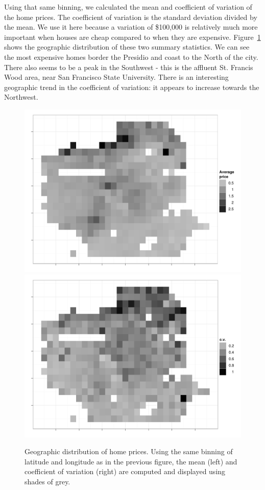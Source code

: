 \documentclass[oneside]{article}
\begin{document}
Using that same binning, we calculated the mean and coefficient of variation of the home prices.  The coefficient of variation is the standard deviation divided by the mean.  We use it here because a variation of \$100,000 is relatively much more important when houses are cheap compared to when they are expensive.  Figure~\ref{fig:sf-price} shows the geographic distribution of these two summary statistics.   We can see the most expensive homes border the Presidio and coast to the North of the city.  There also seems to be a peak in the Southwest - this is the affluent St. Francis Wood area, near San Francisco State University.  There is an interesting geographic trend in the coefficient of variation: it appears to increase towards the Northwest.  

\begin{figure}[htbp]
  \centering
    \includegraphics[width=0.5\linewidth]{sf-bin-price}%
    \includegraphics[width=0.5\linewidth]{sf-bin-cv}
  \caption{Geographic distribution of home prices.  Using the same binning of latitude and longitude as in the previous figure, the mean (left) and coefficient of variation (right) are computed and displayed using shades of grey.}
  \label{fig:sf-price}
\end{figure}

\end{document}
